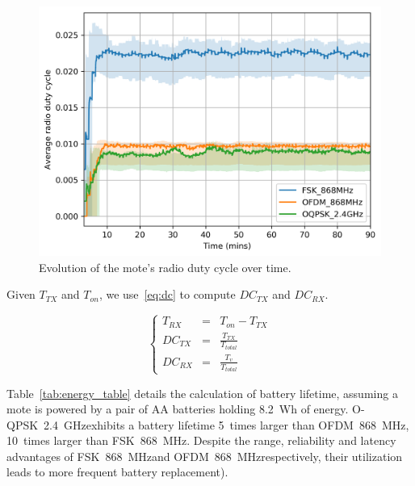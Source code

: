 \documentclass[sensors,article,submit,moreauthors,pdftex]{Definitions/mdpi}
\newcommand{\fsk}           {FSK~868~MHz}
\newcommand{\oqpsk}         {O-QPSK~2.4~GHz}
\newcommand{\ofdm}          {OFDM~868~MHz}
\newcommand{\figwidth}      {0.85}
\begin{document}
\begin{figure}
	\centering
	\includegraphics[width=\figwidth\columnwidth]{dutyCycle_time}
	\caption{
	    Evolution of the mote's radio duty cycle over time.
	}
    \label{fig:dutyCycle_time}
\end{figure}

Given $T_{TX}$ and $T_{on}$, we use~\eqref{eq:dc} to compute $DC_{TX}$ and  $DC_{RX}$.

\begin{equation}
    \left\{
        \begin{array}{lcl}
            T_{RX}  & = & T_{on}-T_{TX}            \\
            DC_{TX} & = & \frac{T_{TX}}{T_{total}} \\
            DC_{RX} & = & \frac{T_{v}}{T_{total}}
        \end{array}
    \right.
    \label{eq:dc}
\end{equation}

Table~\ref{tab:energy_table} details the calculation of battery lifetime, assuming a mote is powered by a pair of AA batteries holding 8.2~Wh of energy.
\oqpsk exhibits a battery lifetime
      5~times larger than \ofdm,
     10~times larger than \fsk.
Despite the range, reliability and latency advantages of \fsk and \ofdm respectively, their utilization leads to more frequent battery replacement).
\end{document}
